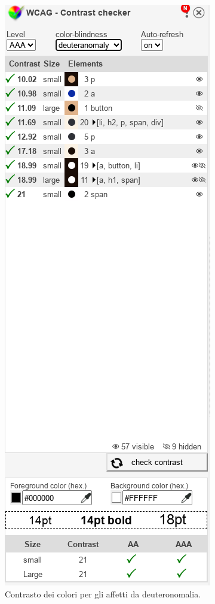 \documentclass{template}
\begin{document}
	\begin{figure}[H]
		\centering
		\includegraphics[scale=0.6]{src/contrasti/deuteranomaly.png}
		\caption{Contrasto dei colori per gli affetti da deuteronomalia.}
	\end{figure}
	\pagebreak
\end{document}
